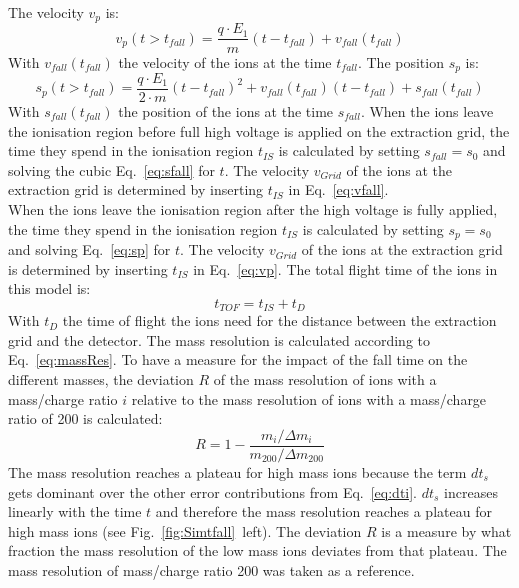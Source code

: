 	The velocity $v_{p}$ is:
	\begin{equation}
		v_{p}(t > t_{fall}) = \frac{q\cdot E_1}{m}(t-t_{fall}) + v_{fall}(t_{fall})
		\label{eq:vp}
	\end{equation}
	With $v_{fall}(t_{fall})$ the velocity of the ions at the time $t_{fall}$. The position $s_{p}$ is:
	\begin{equation}
		s_{p}(t > t_{fall}) = \frac{q\cdot E_1}{2\cdot m}(t-t_{fall})^2 + v_{fall}(t_{fall})(t-t_{fall}) + s_{fall}(t_{fall})
		\label{eq:sp}
	\end{equation}
	With $s_{fall}(t_{fall})$ the position of the ions at the time $s_{fall}$. When the ions leave the ionisation region before full high voltage is applied on the extraction grid, the time they spend in the ionisation region $t_{IS}$ is calculated by setting $s_{fall}=s_0$ and solving the cubic Eq.~\eqref{eq:sfall} for $t$. The velocity $v_{Grid}$ of the ions at the extraction grid is determined by inserting $t_{IS}$ in Eq.~\eqref{eq:vfall}.\\
	When the ions leave the ionisation region after the high voltage is fully applied, the time they spend in the ionisation region $t_{IS}$ is calculated by setting $s_{p}=s_0$ and solving Eq.~\eqref{eq:sp} for $t$. The velocity $v_{Grid}$ of the ions at the extraction grid is determined by inserting $t_{IS}$ in Eq.~\eqref{eq:vp}. The total flight time of the ions in this model is:
	\begin{equation}
		t_{TOF} = t_{IS} + t_D
	\end{equation}
	With $t_{D}$ the time of flight the ions need for the distance between the extraction grid and the detector. The mass resolution is calculated according to Eq.~\eqref{eq:massRes}. To have a measure for the impact of the fall time on the different masses, the deviation $R$ of the mass resolution of ions with a mass/charge ratio $i$ relative to the mass resolution of ions with a mass/charge ratio of 200 is calculated:
	\begin{equation}
		R = 1 - \frac{m_i/\Delta m_i}{m_{200}/\Delta m_{200}}
	\end{equation}
	The mass resolution reaches a plateau for high mass ions because the term $dt_s$ gets dominant over the other error contributions from Eq.~\eqref{eq:dti}. $dt_s$ increases linearly with the time $t$ and therefore the mass resolution reaches a plateau for high mass ions (see Fig.~\ref{fig:Simtfall}~left).	The deviation $R$ is a measure by what fraction the mass resolution of the low mass ions deviates from that plateau. The mass resolution of mass/charge ratio 200 was taken as a reference.
